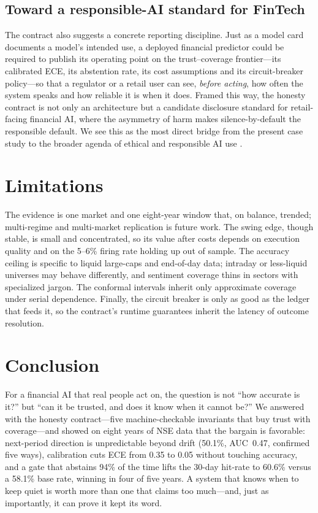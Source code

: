 \documentclass[conference]{IEEEtran}
\begin{document}
\subsection{Toward a responsible-AI standard for FinTech}
The contract also suggests a concrete reporting discipline. Just as a model card
\cite{mitchell2019} documents a model's intended use, a deployed financial
predictor could be required to publish its operating point on the trust--coverage
frontier---its calibrated ECE, its abstention rate, its cost assumptions and its
circuit-breaker policy---so that a regulator or a retail user can see, \emph{before
acting}, how often the system speaks and how reliable it is when it does. Framed
this way, the honesty contract is not only an architecture but a candidate
disclosure standard for retail-facing financial AI, where the asymmetry of harm
makes silence-by-default the responsible default. We see this as the most direct
bridge from the present case study to the broader agenda of ethical and responsible
AI use \cite{jobin2019,amodei2016}.

\section{Limitations}
The evidence is one market and one eight-year window that, on balance, trended;
multi-regime and multi-market replication is future work. The swing edge, though
stable, is small and concentrated, so its value after costs depends on execution
quality and on the 5--6\% firing rate holding up out of sample. The accuracy
ceiling is specific to liquid large-caps and end-of-day data; intraday or
less-liquid universes may behave differently, and sentiment coverage thins in
sectors with specialized jargon. The conformal intervals inherit only approximate
coverage under serial dependence. Finally, the circuit breaker is only as good as
the ledger that feeds it, so the contract's runtime guarantees inherit the latency
of outcome resolution.

\section{Conclusion}
For a financial AI that real people act on, the question is not ``how accurate is
it?'' but ``can it be trusted, and does it know when it cannot be?'' We answered
with the honesty contract---five machine-checkable invariants that buy trust with
coverage---and showed on eight years of NSE data that the bargain is favorable:
next-period direction is unpredictable beyond drift (50.1\%, AUC~0.47, confirmed
five ways), calibration cuts ECE from 0.35 to 0.05 without touching accuracy, and a
gate that abstains 94\% of the time lifts the 30-day hit-rate to 60.6\% versus a
58.1\% base rate, winning in four of five years. A system that knows when to keep
quiet is worth more than one that claims too much---and, just as importantly, it
can prove it kept its word.
\end{document}
